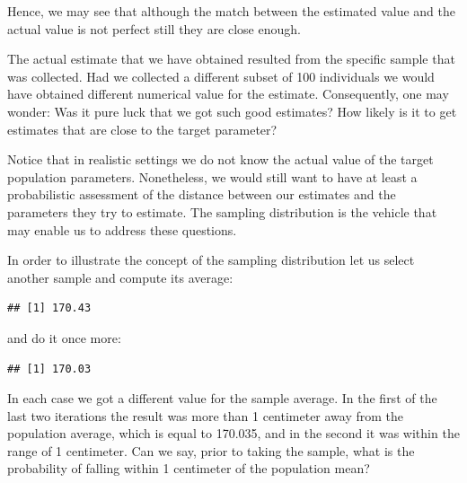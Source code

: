 \documentclass[]{krantz}
\makeatletter
\newenvironment{Shaded}{\begin{snugshade}}{\end{snugshade}}
\newcommand{\DecValTok}[1]{\textcolor[rgb]{0.00,0.00,0.81}{#1}}
\newcommand{\FloatTok}[1]{\textcolor[rgb]{0.00,0.00,0.81}{#1}}
\newcommand{\KeywordTok}[1]{\textcolor[rgb]{0.13,0.29,0.53}{\textbf{#1}}}
\newcommand{\NormalTok}[1]{#1}
\newcommand{\OperatorTok}[1]{\textcolor[rgb]{0.81,0.36,0.00}{\textbf{#1}}}
\newcommand{\StringTok}[1]{\textcolor[rgb]{0.31,0.60,0.02}{#1}}
\newenvironment{kframe}{%
\medskip{}
\setlength{\fboxsep}{.8em}
 \def\at@end@of@kframe{}%
 \ifinner\ifhmode%
  \def\at@end@of@kframe{\end{minipage}}%
  \begin{minipage}{\columnwidth}%
 \fi\fi%
 \def\FrameCommand##1{\hskip\@totalleftmargin \hskip-\fboxsep
 \colorbox{shadecolor}{##1}\hskip-\fboxsep
     \hskip-\linewidth \hskip-\@totalleftmargin \hskip\columnwidth}%
 \MakeFramed {\advance\hsize-\width
   \@totalleftmargin\z@ \linewidth\hsize
   \@setminipage}}%
 {\par\unskip\endMakeFramed%
 \at@end@of@kframe}
\renewenvironment{Shaded}{\begin{kframe}}{\end{kframe}}
\theoremstyle{definition}
\theoremstyle{definition}
\theoremstyle{definition}
\theoremstyle{remark}
\makeatother
\begin{document}
Hence, we may see that although the match between the estimated value
and the actual value is not perfect still they are close enough.

The actual estimate that we have obtained resulted from the specific
sample that was collected. Had we collected a different subset of 100
individuals we would have obtained different numerical value for the
estimate. Consequently, one may wonder: Was it pure luck that we got
such good estimates? How likely is it to get estimates that are close to
the target parameter?

Notice that in realistic settings we do not know the actual value of the
target population parameters. Nonetheless, we would still want to have
at least a probabilistic assessment of the distance between our
estimates and the parameters they try to estimate. The sampling
distribution is the vehicle that may enable us to address these
questions.

In order to illustrate the concept of the sampling distribution let us
select another sample and compute its average:

\begin{Shaded}
\end{Shaded}

\begin{verbatim}
## [1] 170.43
\end{verbatim}

and do it once more:

\begin{Shaded}
\end{Shaded}

\begin{verbatim}
## [1] 170.03
\end{verbatim}

In each case we got a different value for the sample average. In the
first of the last two iterations the result was more than 1 centimeter
away from the population average, which is equal to 170.035, and in the
second it was within the range of 1 centimeter. Can we say, prior to
taking the sample, what is the probability of falling within 1
centimeter of the population mean?
\end{document}
